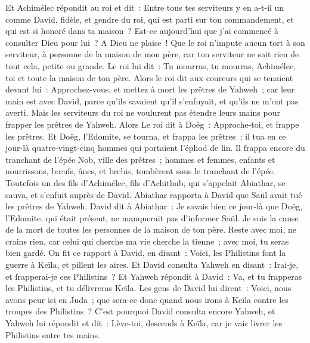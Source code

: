 \begin{multicols}{2}
Et Achimélec répondit au roi et dit~: Entre tous tes serviteurs y en a-t-il un comme David, fidèle, et gendre du roi, qui est parti sur ton commandement, et qui est si honoré dans ta maison~?
Est-ce aujourd'hui que j'ai commencé à consulter Dieu pour lui~? A Dieu ne plaise~! Que le roi n'impute aucun tort à son serviteur, à personne de la maison de mon père, car ton serviteur ne sait rien de tout cela, petite ou grande.
Le roi lui dit~: Tu mourras, tu mourras, Achimélec, toi et toute la maison de ton père.
Alors le roi dit aux coureurs qui se tenaient devant lui~: Approchez-vous, et mettez à mort les prêtres de Yahweh~; car leur main est avec David, parce qu'ils savaient qu'il s'enfuyait, et qu'ils ne m'ont pas averti. Mais les serviteurs du roi ne voulurent pas étendre leurs mains pour frapper les prêtres de Yahweh.
Alors Le roi dit à Doëg~: Approche-toi, et frappe les prêtres. Et Doëg, l'Edomite, se tourna, et frappa les prêtres~; il tua en ce jour-là quatre-vingt-cinq hommes qui portaient l'éphod de lin.
Il frappa encore du tranchant de l'épée Nob, ville des prêtres~; hommes et femmes, enfants et nourrissons, bœufs, ânes, et brebis, tombèrent sous le tranchant de l'épée.
Toutefois un des fils d'Achimélec, fils d'Achithub, qui s'appelait Abiathar, se sauva, et s'enfuit auprès de David.
Abiathar rapporta à David que Saül avait tué les prêtres de Yahweh.
David dit à Abiathar~: Je savais bien ce jour-là que Doëg, l'Edomite, qui était présent, ne manquerait pas d'informer Saül. Je suis la cause de la mort de toutes les personnes de la maison de ton père.
Reste avec moi, ne crains rien, car celui qui cherche ma vie cherche la tienne~; avec moi, tu seras bien gardé.
\VerseOne{}On fit ce rapport à David, en disant~: Voici, les Philistins font la guerre à Keïla, et pillent les aires.
Et David consulta Yahweh en disant~: Irai-je, et frapperai-je ces Philistins~? Et Yahweh répondit à David~: Va, et tu frapperas les Philistins, et tu délivreras Keïla.
Les gens de David lui dirent~: Voici, nous avons peur ici en Juda~; que sera-ce donc quand nous irons à Keïla contre les troupes des Philistins~?
C'est pourquoi David consulta encore Yahweh, et Yahweh lui répondit et dit~: Lève-toi, descends à Keïla, car je vais livrer les Philistins entre tes mains.

\end{multicols}
